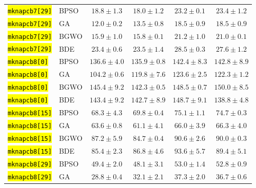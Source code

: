 \documentclass[mathematics,article,accept,moreauthors]{Definitions/mdpi}
\begin{document}
\begin{table}[H]
\begin{tabularx}{\textwidth}{XLCCCC}
    \texttt{\hl{mknapcb7[29]}} & BPSO  &           $18.8 \pm 1.3$ &  $\mathbf{18.0 \pm 1.2}$ &           $23.2 \pm 0.1$ &           $23.4 \pm 1.2$ \\
    \texttt{\hl{mknapcb7[29]}} & GA    &  $\mathbf{12.0 \pm 0.2}$ &           $13.5 \pm 0.8$ &           $18.5 \pm 0.9$ &           $18.5 \pm 0.9$ \\
    \texttt{\hl{mknapcb7[29]}} & BGWO  &           $15.9 \pm 1.0$ &  $\mathbf{15.8 \pm 0.1}$ &           $21.2 \pm 1.0$ &           $21.0 \pm 0.1$ \\
    \texttt{\hl{mknapcb7[29]}} & BDE   &  $\mathbf{23.4 \pm 0.6}$ &           $23.5 \pm 1.4$ &           $28.5 \pm 0.3$ &           $27.6 \pm 1.2$ \\
    \midrule
    \texttt{\hl{mknapcb8[0]}} & BPSO  &          $136.6 \pm 4.0$ & $\mathbf{135.9 \pm 0.8}$ &          $142.4 \pm 8.3$ &          $142.8 \pm 8.9$ \\
    \texttt{\hl{mknapcb8[0]}} & GA    & $\mathbf{104.2 \pm 0.6}$ &          $119.8 \pm 7.6$ &          $123.6 \pm 2.5$ &          $122.3 \pm 1.2$ \\
    \texttt{\hl{mknapcb8[0]}} & BGWO  &          $145.4 \pm 9.2$ & $\mathbf{142.3 \pm 0.5}$ &          $148.5 \pm 0.7$ &          $150.0 \pm 8.5$ \\
    \texttt{\hl{mknapcb8[0]}} & BDE   &          $143.4 \pm 9.2$ &          $142.7 \pm 8.9$ &          $148.7 \pm 9.1$ & $\mathbf{138.8 \pm 4.8}$ \\
    \midrule
    \texttt{\hl{mknapcb8[15]}} & BPSO  &  $\mathbf{68.3 \pm 4.3}$ &           $69.8 \pm 0.4$ &           $75.1 \pm 1.1$ &           $74.7 \pm 0.3$ \\
    \texttt{\hl{mknapcb8[15]}} & GA    &           $63.6 \pm 0.8$ &  $\mathbf{61.1 \pm 4.1}$ &           $66.0 \pm 3.9$ &           $66.3 \pm 4.0$ \\
    \texttt{\hl{mknapcb8[15]}} & BGWO  &           $87.2 \pm 5.9$ &  $\mathbf{84.7 \pm 0.4}$ &           $90.6 \pm 2.6$ &           $90.0 \pm 0.3$ \\
    \texttt{\hl{mknapcb8[15]}} & BDE   &  $\mathbf{85.4 \pm 2.3}$ &           $86.8 \pm 4.6$ &           $93.6 \pm 5.7$ &           $89.4 \pm 5.1$ \\
    \midrule
    \texttt{\hl{mknapcb8[29]}} & BPSO  &           $49.4 \pm 2.0$ &  $\mathbf{48.1 \pm 3.1}$ &           $53.0 \pm 1.4$ &           $52.8 \pm 0.9$ \\
    \texttt{\hl{mknapcb8[29]}} & GA    &  $\mathbf{28.8 \pm 0.4}$ &           $32.1 \pm 2.1$ &           $37.3 \pm 2.0$ &           $36.7 \pm 0.6$ \\

\end{tabularx}
\end{table}
\end{document}
